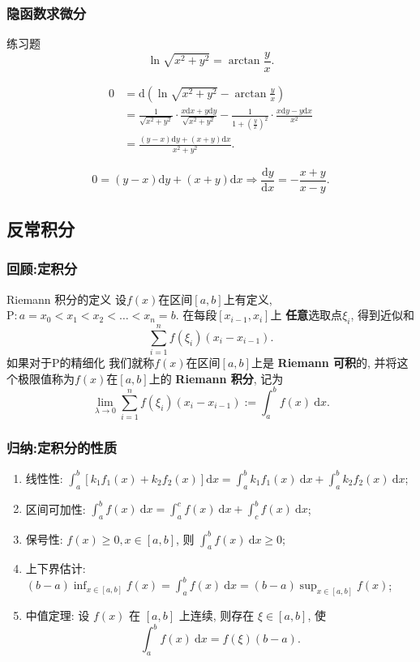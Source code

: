\documentclass[
10pt,
aspectratio=43,
]{beamer}
\begin{document}
\begin{frame}
	\frametitle{隐函数求微分}
	\everymath{\displaystyle}
	\begin{block}{练习题}
		$$
			\ln \sqrt{x^2+y^2}=\arctan \frac{y}{x}.
		$$
	\end{block}

	\begin{exampleblock}{}
		$$
		\begin{aligned}
			0&=\mathrm{d}\left(\ln \sqrt{x^2+y^2}-\arctan \frac{y}{x}\right)\\
			&=\frac{1}{{\sqrt{x^2+y^2}}}\cdot\frac{x\mathrm{d}x+y\mathrm{d}y}{\sqrt{x^2+y^2}}-\frac{1}{1+\left(\frac{y}{x}\right)^2}\cdot\frac{x\mathrm{d}y-y\mathrm{d}x}{x^2}\\
			&=\frac{(y-x)\mathrm{d}y+(x+y)\mathrm{d}x}{x^2+y^2}.
		\end{aligned}
		$$
	\end{exampleblock}
	\begin{exampleblock}{}
		$$
		0=(y-x)\mathrm{d}y+(x+y)\mathrm{d}x\Rightarrow\frac{\mathrm{d}y}{\mathrm{d}x}=-\frac{x+y}{x-y}.
		$$
	\end{exampleblock}
\end{frame}



\subsection{反常积分}
\begin{frame}
	\frametitle{回顾:定积分}
	\begin{block}{Riemann 积分的定义}
		设$f(x)$在区间$[a,b]$上有定义, $\mathrm{P}:a=x_0<x_1<x_2<\ldots<x_n=b$.
		在每段$[x_{i-1},x_i]$上 {\bf 任意}选取点$\xi_i$, 得到近似和
		$$
			\sum_{i=1}^n f(\xi_i)(x_i-x_{i-1}).
		$$
		如果对于$\mathrm{P}$的精细化
		我们就称$f(x)$在区间$[a,b]$上是 {\bf Riemann 可积}的, 并将这个极限值称为$f(x)$在$[a,b]$上的 {\bf Riemann 积分}, 记为
		\[
			\lim_{\lambda\to 0} \sum_{i=1}^n f(\xi_i)(x_i-x_{i-1}) := \int_a^b f(x)\mathrm{~d} x.
		\]
	\end{block}

\end{frame}
\begin{frame}
	\frametitle{归纳:定积分的性质}
	\everymath{\displaystyle}
	\begin{enumerate}
		\item 线性性: $\int_a^b[k_1f_1(x) + k_2f_2(x)] \mathrm{d} x=\int_a^b k_1f_1(x) \mathrm{~d} x+\int_a^b k_2f_2(x) \mathrm{~d}x$;
		\item 区间可加性: $\int_a^b f(x) \mathrm{~d} x=\int_a^c f(x) \mathrm{~d} x+\int_c^b f(x) \mathrm{~d} x$;
		\item 保号性: $f(x) \geq 0, x\in[a,b]$, 则 $\int_a^b f(x) \mathrm{~d} x\geq 0$;
		\item 上下界估计: $(b-a)\inf_{x\in[a,b]}f(x)=\int_a^{b} f(x) \mathrm{~d} x=(b-a)\sup_{x\in[a,b]}f(x)$;
		\item 中值定理: 设 $f(x)$ 在 $[a, b]$ 上连续, 则存在 $\xi\in[a, b]$, 使
		      $$
			      \int_a^b f(x) \mathrm{~d} x=f(\xi)(b-a).
		      $$
	\end{enumerate}
	\vspace{0.5cm}
\end{frame}
\end{document}
